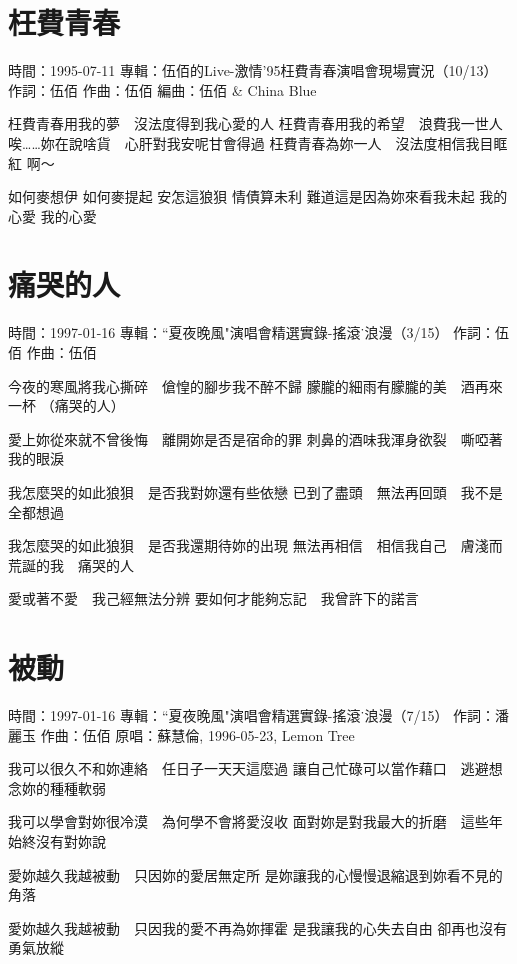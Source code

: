 \documentclass[UTF8,a4paper,oneside,twocolumn,12pt]{ctexbook}
\newcommand{\infopair}[2]{\textbullet #1：#2}
\newcommand{\zc}[1][伍佰]{\infopair{作詞}{#1}}
\newcommand{\zq}[1][伍佰]{\infopair{作曲}{#1}}
\newcommand{\bq}[1][伍佰]{\infopair{編曲}{#1}}
\newcommand{\zj}[1]{\infopair{專輯}{#1}}
\newcommand{\yc}[1]{\infopair{原唱}{#1}}
\newcommand{\sj}[1]{\infopair{時間}{#1}}
\newenvironment{info}{\begin{flushleft}\kaishu
	}
	{\end{flushleft}\normalsize\yahei\par}
\newenvironment{lyric}{
	}
{}
\begin{document}
\section{枉費青春}
\begin{info}
	\sj{1995-07-11}
	\zj{伍佰的Live-激情'95枉費青春演唱會現場實況（10/13）}
	\zc
	\zq
	\bq[伍佰 \& China Blue]
\end{info}
\begin{lyric}
	枉費青春用我的夢　沒法度得到我心愛的人
	枉費青春用我的希望　浪費我一世人
	唉……妳在說啥貨　心肝對我安呢甘會得過
	枉費青春為妳一人　沒法度相信我目眶紅
	啊～

	如何麥想伊
	如何麥提起
	安怎這狼狽
	情債算未利
	難道這是因為妳來看我未起
	我的心愛
	我的心愛
\end{lyric}

\section{痛哭的人}
\begin{info}
	\sj{1997-01-16}
	\zj{``夏夜晚風"演唱會精選實錄-搖滾˙浪漫（3/15）}
	\zc
	\zq
\end{info}
\begin{lyric}
	今夜的寒風將我心撕碎　傖惶的腳步我不醉不歸
	朦朧的細雨有朦朧的美　酒再來一杯 （痛哭的人）

	愛上妳從來就不曾後悔　離開妳是否是宿命的罪
	刺鼻的酒味我渾身欲裂　嘶啞著我的眼淚

	我怎麼哭的如此狼狽　是否我對妳還有些依戀
	已到了盡頭　無法再回頭　我不是全都想過

	我怎麼哭的如此狼狽　是否我還期待妳的出現
	無法再相信　相信我自己　膚淺而荒誕的我　痛哭的人

	愛或著不愛　我己經無法分辨
	要如何才能夠忘記　我曾許下的諾言
\end{lyric}

\section{被動}
\begin{info}
	\sj{1997-01-16}
	\zj{``夏夜晚風"演唱會精選實錄-搖滾˙浪漫（7/15）}
	\zc[潘麗玉]
	\zq
	\yc{蘇慧倫, 1996-05-23, Lemon Tree}
\end{info}
\begin{lyric}
	我可以很久不和妳連絡　任日子一天天這麼過
	讓自己忙碌可以當作藉口　逃避想念妳的種種軟弱

	我可以學會對妳很冷漠　為何學不會將愛沒收
	面對妳是對我最大的折磨　這些年始終沒有對妳說

	愛妳越久我越被動　只因妳的愛居無定所
	是妳讓我的心慢慢退縮退到妳看不見的角落

	愛妳越久我越被動　只因我的愛不再為妳揮霍
	是我讓我的心失去自由  卻再也沒有勇氣放縱
\end{lyric}
\end{document}
